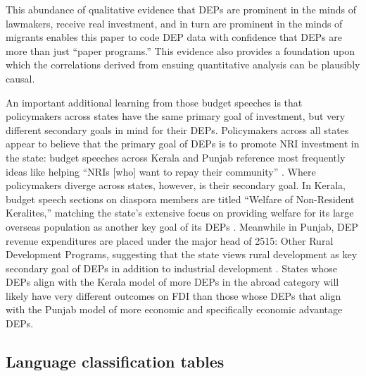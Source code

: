 \documentclass[12pt]{article}
\let\oldsubsection\subsection
\renewcommand{\subsection}{\FloatBarrier\oldsubsection}
\begin{document}
    This abundance of qualitative evidence that DEPs are prominent in the minds of lawmakers, receive real investment, and in turn are prominent in the minds of migrants enables this paper to code DEP data with confidence that DEPs are more than just ``paper programs.'' This evidence also provides a foundation upon which the correlations derived from ensuing quantitative analysis can be plausibly causal.
    
    An important additional learning from those budget speeches is that policymakers across states have the same primary goal of investment, but very different secondary goals in mind for their DEPs. Policymakers across all states appear to believe that the primary goal of DEPs is to promote NRI investment in the state: budget speeches across Kerala and Punjab reference most frequently ideas like helping ``NRIs [who] want to repay their community'' \citep{singh_badal_speech_2017}. Where policymakers diverge across states, however, is their secondary goal. In Kerala, budget speech sections on diaspora members are titled ``Welfare of Non-Resident Keralites,'' matching the state's extensive focus on providing welfare for its large overseas population as another key goal of its DEPs \citep{isaac_government_2016}. Meanwhile in Punjab, DEP revenue expenditures are placed under the major head of 2515: Other Rural Development Programs, suggesting that the state views rural development as key secondary goal of DEPs in addition to industrial development \citep{finance_department_punjab_detailed_2013}. States whose DEPs align with the Kerala model of more DEPs in the abroad category will likely have very different outcomes on FDI than those whose DEPs that align with the Punjab model of more economic and specifically economic advantage DEPs.

\subsection{Language classification tables}
\end{document}
